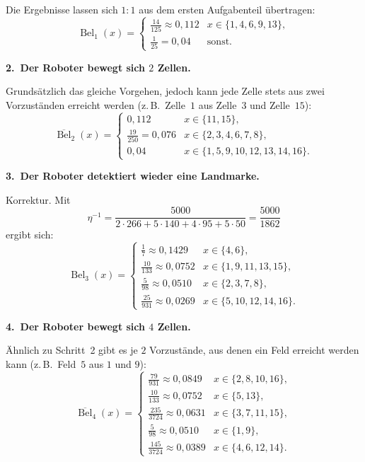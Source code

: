 \documentclass[11pt,a4paper]{article}
\newcommand{\Bel}{\operatorname{Bel}}
\newcommand{\pBel}{\overline{\operatorname{Bel}}}
\begin{document}
Die Ergebnisse lassen sich $1{:}1$ aus dem ersten Aufgabenteil übertragen:
\[
  \Bel_1(x) =
  \begin{cases}
    \tfrac{14}{125}\approx 0{,}112 & x\in\{1,4,6,9,13\},\\[0.3em]
    \tfrac{1}{25}=0{,}04 & \text{sonst.}
  \end{cases}
\]

\textbf{2.\ Der Roboter bewegt sich $2$ Zellen.}

Grundsätzlich das gleiche Vorgehen, jedoch kann jede Zelle stets aus zwei Vorzuständen erreicht
werden (z.\,B.\ Zelle~$1$ aus Zelle~$3$ und Zelle~$15$):
\[
  \pBel_2(x) =
  \begin{cases}
    0{,}112 & x\in\{11,15\},\\
    \tfrac{19}{250}=0{,}076 & x\in\{2,3,4,6,7,8\},\\
    0{,}04  & x\in\{1,5,9,10,12,13,14,16\}.
  \end{cases}
\]

\textbf{3.\ Der Roboter detektiert wieder eine Landmarke.}

Korrektur. Mit
\[
  \eta^{-1} = \frac{5000}{2\cdot 266 + 5\cdot 140 + 4\cdot 95 + 5\cdot 50} = \frac{5000}{1862}
\]
ergibt sich:
\[
  \Bel_3(x) =
  \begin{cases}
    \tfrac{1}{7}\approx 0{,}1429 & x\in\{4,6\},\\[0.3em]
    \tfrac{10}{133}\approx 0{,}0752 & x\in\{1,9,11,13,15\},\\[0.3em]
    \tfrac{5}{98}\approx 0{,}0510 & x\in\{2,3,7,8\},\\[0.3em]
    \tfrac{25}{931}\approx 0{,}0269 & x\in\{5,10,12,14,16\}.
  \end{cases}
\]

\textbf{4.\ Der Roboter bewegt sich $4$ Zellen.}

Ähnlich zu Schritt~2 gibt es je $2$ Vorzustände, aus denen ein Feld erreicht werden kann
(z.\,B.\ Feld~$5$ aus $1$ und $9$):
\[
  \pBel_4(x) =
  \begin{cases}
    \tfrac{79}{931}\approx 0{,}0849 & x\in\{2,8,10,16\},\\[0.3em]
    \tfrac{10}{133}\approx 0{,}0752 & x\in\{5,13\},\\[0.3em]
    \tfrac{235}{3724}\approx 0{,}0631 & x\in\{3,7,11,15\},\\[0.3em]
    \tfrac{5}{98}\approx 0{,}0510 & x\in\{1,9\},\\[0.3em]
    \tfrac{145}{3724}\approx 0{,}0389 & x\in\{4,6,12,14\}.
  \end{cases}
\]
\end{document}
